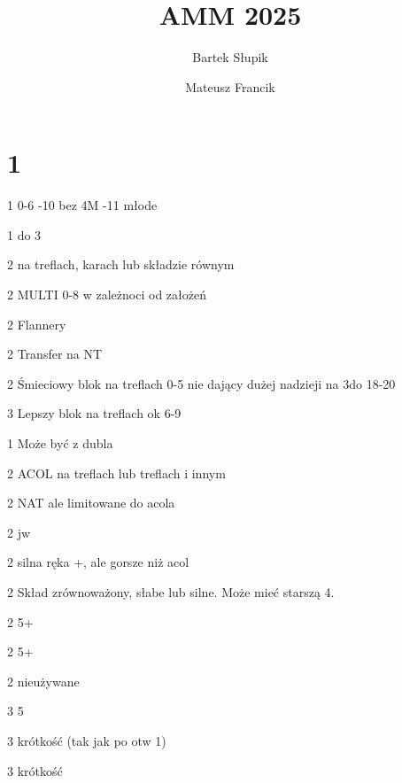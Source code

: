 \documentclass[12pt, a4paper]{article}
\title{\vspace{-2cm}AMM 2025}
\date{}
\author{Bartek Słupik \and Mateusz Francik}
\begin{document}
\maketitle

\section*{1\clubs}

\sequence{{1\clubs}}
\begin{options}[2]
	\item[1\diams\alrt] 0-6 -10 bez 4M -11 młode  
	\item[1\nt\alrt] \inv do 3\nt \vimp 
	\item[2\clubs\alrt] \gf na treflach, karach lub składzie równym \vimp
	\item[2\diams\alrt] MULTI 0-8 w zależnoci od założeń \vimp
	\item[2\hearts\alrt] Flannery
	\item[2\spades\alrt] Transfer na NT 
	\item[2\nt\alrt] Śmieciowy blok na treflach 0-5 nie dający dużej nadzieji na 3\nt do 18-20 \imp
	\item[3\clubs] Lepszy blok na treflach ok 6-9
\end{options}


\sequence{{1\clubs}{1\diams}}
\begin{options}[1]
	\item[1\hearts\alrt] Może być z dubla
	\item[2\diams\alrt] ACOL na treflach lub treflach i innym \imp
	\item[2\hearts] NAT ale limitowane do acola \nf
	\item[2\spades] jw
	\item[2\nt\alrt] silna ręka \clubs+\diams, ale gorsze niż acol
\end{options}


\sequence{{1\clubs}{2\clubs}}
\begin{options}[1]
	\item[2\diams\alrt] Skład zrównoważony, słabe lub silne. Może mieć starszą 4. \vimp
	\item[2\hearts] 5+\hearts
	\item[2\spades] 5+\spades
	\item[2\nt] nieużywane
	\item[3\diams] 5\diams
	\item[3\hearts] krótkość (tak jak po otw 1\nt)
	\item[3\spades] krótkość
\end{options}
\end{document}
